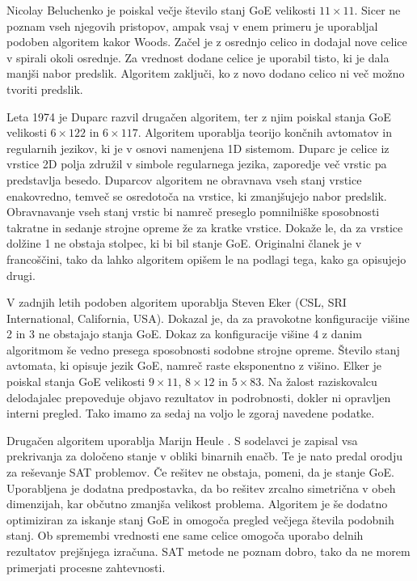 \documentclass[12pt,a4paper,openany,twoside]{book}
\begin{document}
Nicolay Beluchenko je poiskal večje število stanj GoE velikosti \(11 \times 11\).
Sicer ne poznam vseh njegovih pristopov, ampak vsaj v enem primeru je uporabljal
podoben algoritem kakor Woods. Začel je z osrednjo celico in dodajal nove celice
v spirali okoli osrednje. Za vrednost dodane celice je uporabil tisto, ki je dala manjši nabor predslik.
Algoritem zaključi, ko z novo dodano celico ni več možno tvoriti predslik.

Leta 1974 je Duparc \cite{Duparc1972, Duparc1974} razvil drugačen algoritem,
ter z njim poiskal stanja GoE velikosti \(6 \times 122\) in \(6 \times 117\).
Algoritem uporablja teorijo končnih avtomatov in regularnih jezikov, ki je v
osnovi namenjena 1D sistemom.
Duparc je celice iz vrstice 2D polja združil v simbole regularnega jezika,
zaporedje več vrstic pa predstavlja besedo.
Duparcov algoritem ne obravnava vseh stanj vrstice enakovredno,
temveč se osredotoča na vrstice, ki zmanjšujejo nabor predslik.
Obravnavanje vseh stanj vrstic bi namreč preseglo pomnilniške sposobnosti
takratne in sedanje strojne opreme že za kratke vrstice.
Dokaže le, da za vrstice dolžine 1 ne obstaja stolpec, ki bi bil stanje GoE.
Originalni članek je v francoščini, tako da lahko algoritem opišem le na podlagi tega, kako ga opisujejo drugi.

V zadnjih letih podoben algoritem uporablja Steven Eker (CSL, SRI International, California, USA).
Dokazal je, da za pravokotne konfiguracije višine 2 in 3 ne obstajajo stanja GoE.
Dokaz za konfiguracije višine 4 z danim algoritmom še vedno presega sposobnosti sodobne strojne opreme.
Število stanj avtomata, ki opisuje jezik GoE, namreč raste eksponentno z višino.
Elker je poiskal stanja GoE velikosti \(9 \times 11\), \(8 \times 12\) in \(5 \times 83\).
Na žalost raziskovalcu delodajalec prepoveduje objavo rezultatov in podrobnosti, dokler ni opravljen interni pregled.
Tako imamo za sedaj na voljo le zgoraj navedene podatke.

Drugačen algoritem uporablja Marijn Heule \cite{Hartman2013}.
S sodelavci je zapisal vsa prekrivanja za določeno stanje v obliki binarnih enačb.
Te je nato predal orodju za reševanje SAT problemov.
Če rešitev ne obstaja, pomeni, da je stanje GoE.
Uporabljena je dodatna predpostavka, da bo rešitev zrcalno simetrična v obeh dimenzijah,
kar občutno zmanjša velikost problema.
Algoritem je še dodatno optimiziran za iskanje stanj GoE in
omogoča pregled večjega števila podobnih stanj.
Ob spremembi vrednosti ene same celice omogoča uporabo delnih rezultatov prejšnjega izračuna.
SAT metode ne poznam dobro, tako da ne morem primerjati procesne zahtevnosti.
\end{document}

